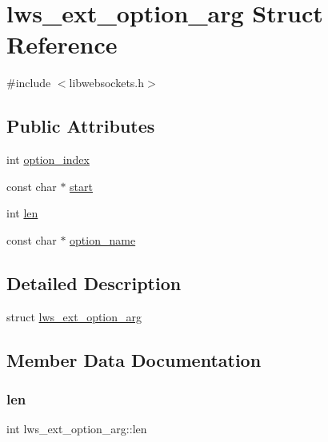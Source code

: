 \hypertarget{structlws__ext__option__arg}{}\section{lws\+\_\+ext\+\_\+option\+\_\+arg Struct Reference}
\label{structlws__ext__option__arg}


{\ttfamily \#include $<$libwebsockets.\+h$>$}

\subsection*{Public Attributes}
\begin{DoxyCompactItemize}
\item 
int \hyperlink{structlws__ext__option__arg_af57fffcfa253dfa8d98681ac1fb1785f}{option\+\_\+index}
\item 
const char $\ast$ \hyperlink{structlws__ext__option__arg_a7d2fa369f803951a60d7ccc659ab9336}{start}
\item 
int \hyperlink{structlws__ext__option__arg_af37f0b6caa7735af51a1ac12b68d5bc5}{len}
\item 
const char $\ast$ \hyperlink{structlws__ext__option__arg_a9765ac0e65c7be451a91ff334554d606}{option\+\_\+name}
\end{DoxyCompactItemize}


\subsection{Detailed Description}
struct \hyperlink{structlws__ext__option__arg}{lws\+\_\+ext\+\_\+option\+\_\+arg} 

\subsection{Member Data Documentation}
\mbox{\label{structlws__ext__option__arg_af37f0b6caa7735af51a1ac12b68d5bc5}} 
\subsubsection{\texorpdfstring{len}{len}}
{\footnotesize\ttfamily int lws\+\_\+ext\+\_\+option\+\_\+arg\+::len}

